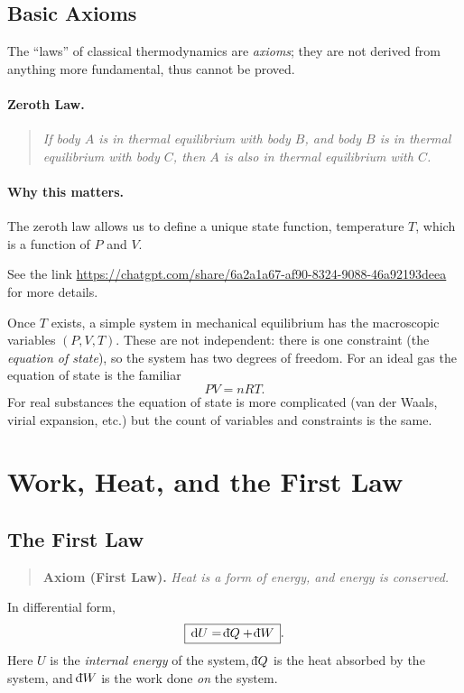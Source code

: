 \subsection{Basic Axioms}

The ``laws'' of classical thermodynamics are \emph{axioms}; 
they are not derived from anything more fundamental, thus cannot be proved.

\paragraph{Zeroth Law.}
\begin{quote}
\textit{If body $A$ is in thermal equilibrium with body $B$, and body $B$ is in thermal equilibrium with body $C$, then $A$ is also in thermal equilibrium with $C$.}
\end{quote}

\paragraph{Why this matters.}
The zeroth law allows us to define a unique state function, temperature $T$, which 
is a function of $P$ and $V$. 

See the link \url{https://chatgpt.com/share/6a2a1a67-af90-8324-9088-46a92193deea} for more details.

Once $T$ exists, a simple system in mechanical equilibrium has the macroscopic variables $(P,V,T)$. These are not independent: there is one constraint (the \emph{equation of state}), so the system has two degrees of freedom. For an ideal gas the equation of state is the familiar
\[
    PV = nRT.
\]
For real substances the equation of state is more complicated (van der Waals, virial expansion, etc.) but the count of variables and constraints is the same.

\section{Work, Heat, and the First Law}

\subsection{The First Law}

\begin{quote}
\textbf{Axiom (First Law).} \textit{Heat is a form of energy, and energy is conserved.}
\end{quote}
In differential form,
\[
    \boxed{\,\dd U = \dbar Q + \dbar W\,}.
\]
Here $U$ is the \emph{internal energy} of the system, $\dbar Q$ is the heat absorbed by the system, and $\dbar W$ is the work done \emph{on} the system. 

